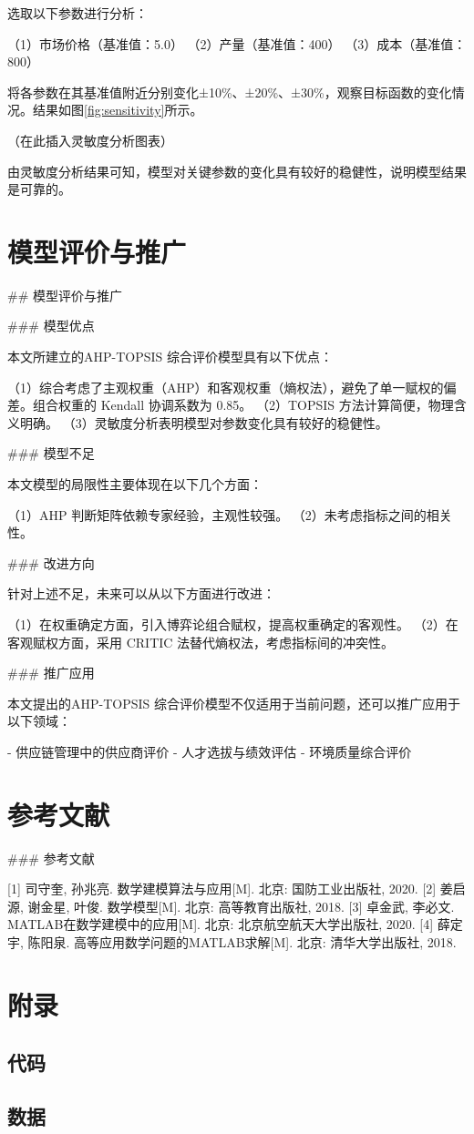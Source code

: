 \documentclass[12pt,a4paper]{article}
\begin{document}
选取以下参数进行分析：

（1）市场价格（基准值：5.0）
（2）产量（基准值：400）
（3）成本（基准值：800）

将各参数在其基准值附近分别变化±10\%、±20\%、±30\%，观察目标函数的变化情况。结果如图\ref{fig:sensitivity}所示。

（在此插入灵敏度分析图表）

由灵敏度分析结果可知，模型对关键参数的变化具有较好的稳健性，说明模型结果是可靠的。

\section{模型评价与推广}
## 模型评价与推广

### 模型优点

本文所建立的AHP-TOPSIS 综合评价模型具有以下优点：

（1）综合考虑了主观权重（AHP）和客观权重（熵权法），避免了单一赋权的偏差。组合权重的 Kendall 协调系数为 0.85。
（2）TOPSIS 方法计算简便，物理含义明确。
（3）灵敏度分析表明模型对参数变化具有较好的稳健性。

### 模型不足

本文模型的局限性主要体现在以下几个方面：

（1）AHP 判断矩阵依赖专家经验，主观性较强。
（2）未考虑指标之间的相关性。

### 改进方向

针对上述不足，未来可以从以下方面进行改进：

（1）在权重确定方面，引入博弈论组合赋权，提高权重确定的客观性。
（2）在客观赋权方面，采用 CRITIC 法替代熵权法，考虑指标间的冲突性。

### 推广应用

本文提出的AHP-TOPSIS 综合评价模型不仅适用于当前问题，还可以推广应用于以下领域：

- 供应链管理中的供应商评价
- 人才选拔与绩效评估
- 环境质量综合评价


\section{参考文献}
### 参考文献

[1] 司守奎, 孙兆亮. 数学建模算法与应用[M]. 北京: 国防工业出版社, 2020.
[2] 姜启源, 谢金星, 叶俊. 数学模型[M]. 北京: 高等教育出版社, 2018.
[3] 卓金武, 李必文. MATLAB在数学建模中的应用[M]. 北京: 北京航空航天大学出版社, 2020.
[4] 薛定宇, 陈阳泉. 高等应用数学问题的MATLAB求解[M]. 北京: 清华大学出版社, 2018.

\section{附录}
\subsection{代码}

\subsection{数据}
\end{document}
